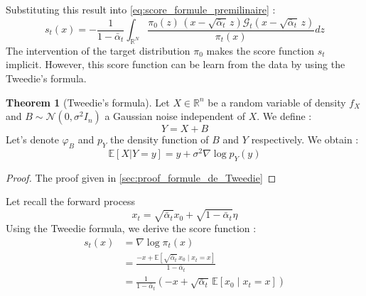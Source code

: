 \documentclass[a4paper,10pt]{article}
\theoremstyle{definition} %
\theoremstyle{definition} %
\theoremstyle{definition} %
\newtheorem{theorem}[definition]{Theorem}
\theoremstyle{definition} %
\newcommand{\R}{\mathbb{R}}
\newcommand{\0}{\boldsymbol{0}}
\begin{document}
Substituting this result into \cref{eq:score_formule_premilinaire} :
\begin{equation}\label{eq:score_formule_analytique}
    s_t(x) = -\frac{1}{1- \bar \alpha_t} \int_{\R^N} \frac{\pi_0(z)\, (x - \sqrt{\bar \alpha_t} \,z) \mathcal{G}_t(x - \sqrt{\bar \alpha_t} \,z)}{\pi_t(x)} dz
\end{equation}
The intervention of the target distribution $\pi_0$ makes the score function $s_t$ implicit. However, this score function can be learn from the data by using the Tweedie's formula.
\begin{theorem}[Tweedie's formula]\label{theo:formule_de_Tweedie}
    Let $X \in \mathbb{R}^n$ be a random variable of density $f_X$ and $B \sim \mathcal{N}(0, \sigma^2 I_n)$ a Gaussian noise independent of $X$. We define :
    \[ Y = X + B \]
    Let's denote $\varphi_B$ and $p_Y$ the density function of $B$ and $Y$ respectively. We obtain :
    \[ \mathbb{E}[X | Y = y] = y + \sigma^2 \nabla \log p_Y(y) \]
\end{theorem}
\begin{proof}
    The proof given in \cref{sec:proof_formule_de_Tweedie}
\end{proof}
Let recall the forward process
\[ x_t = \sqrt{\bar \alpha_t} x_0 + \sqrt{1 - \bar \alpha_t} \eta \]
Using the  Tweedie formula, we derive the score function :
\begin{align*}
s_t(x) &= \nabla \log \pi_t(x) \\
&= \frac{-x + \mathbb{E} \left[\sqrt{\bar \alpha_t}\, x_0 \mid x_t = x \right]}{1 - \bar \alpha_t} \\
&= \frac{1}{1 - \bar \alpha_t} \left( -x + \sqrt{\bar \alpha_t} \,\mathbb{E} \left[ x_0 \mid x_t = x \right] \right)
\end{align*}
\end{document}
